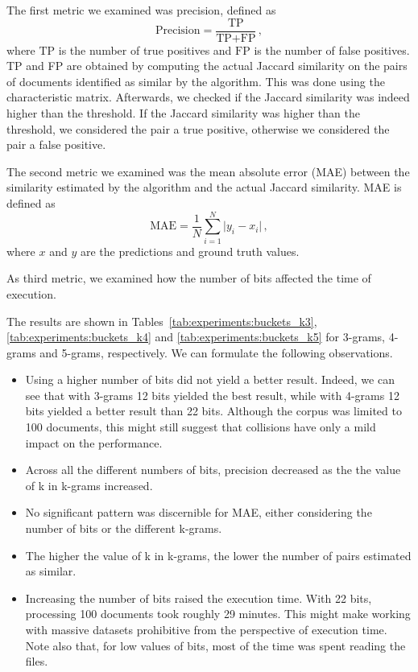 \documentclass[runningheads]{llncs}
\begin{document}
The first metric we examined was precision, defined as 
\[
  \text{Precision} = \frac{\text{TP}}{\text{TP} + \text{FP}}\,,
\]
where $\text{TP}$ is the number of true positives and $\text{FP}$ is the number of false positives. TP and FP are obtained by computing the actual Jaccard similarity on the pairs of documents identified as similar by the algorithm. This was done using the characteristic matrix. Afterwards, we checked if the Jaccard similarity was indeed higher than the threshold. If the Jaccard similarity was higher than the threshold, we considered the pair a true positive, otherwise we considered the pair a false positive.

The second metric we examined was the mean absolute error (MAE) between the similarity estimated by the algorithm and the actual Jaccard similarity. MAE is defined as
\[
  \text{MAE} = \frac{1}{N}\sum_{i=1}^N \lvert y_i - x_i \rvert \,,
\]
where $x$ and $y$ are the predictions and ground truth values.

As third metric, we examined how the number of bits affected the time of execution.

The results are shown in Tables~\ref{tab:experiments:buckets_k3}, \ref{tab:experiments:buckets_k4} and \ref{tab:experiments:buckets_k5} for 3-grams, 4-grams and 5-grams, respectively. We can formulate the following observations.

\begin{itemize}
  \item Using a higher number of bits did not yield a better result. Indeed, we can see that with 3-grams 12 bits yielded the best result, while with 4-grams 12 bits yielded a better result than 22 bits. Although the corpus was limited to 100 documents, this might still suggest that collisions have only a mild impact on the performance.
  \item Across all the different numbers of bits, precision decreased as the the value of k in k-grams increased. 
  \item No significant pattern was discernible for MAE, either considering the number of bits or the different k-grams.
  \item The higher the value of k in k-grams, the lower the number of pairs estimated as similar.
  \item Increasing the number of bits raised the execution time. With 22 bits, processing 100 documents took roughly 29 minutes. This might make working with massive datasets prohibitive from the perspective of execution time. Note also that, for low values of bits, most of the time was spent reading the files.  
\end{itemize}
\end{document}

